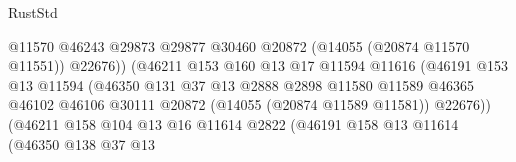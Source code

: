 \begin{lexlean}{RustStd}
\begin{coremodule}
                                              @11570
                                              @46243
                                              @29873
                                              @29877
                                              @30460
                                              @20872
                                              (@14055 (@20874 @11570 @11551))
                                              @22676))
                                          (@46211
                                            @153
                                            @160
                                            @13
                                            @17
                                            @11594
                                            @11616
                                            (@46191
                                              @153
                                              @13
                                              @11594
                                              (@46350
                                                @131
                                                @37
                                                @13
                                                @2888
                                                @2898
                                                @11580
                                                @11589
                                                @46365
                                                @46102
                                                @46106
                                                @30111
                                                @20872
                                                (@14055 (@20874 @11589 @11581))
                                                @22676))
                                            (@46211
                                              @158
                                              @104
                                              @13
                                              @16
                                              @11614
                                              @2822
                                              (@46191
                                                @158
                                                @13
                                                @11614
                                                (@46350
                                                  @138
                                                  @37
                                                  @13

\end{coremodule}
\end{lexlean}
